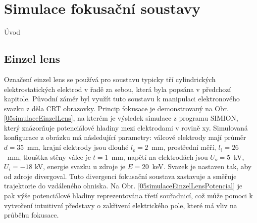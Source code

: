 \newpage
\chapter{Simulace fokusační soustavy}

Úvod

\section{Einzel lens}

Označení einzel lens se používá pro soustavu typicky tří cylindrických elektrostatických elektrod v řadě za sebou, která byla popsána v předchozí kapitole. Původní záměr byl využít tuto soustavu k manipulaci elektronového svazku z děla CRT obrazovky.
Princip fokusace je demonstrovaný na Obr. \ref{05simulaceEinzelLens}, na kterém je výsledek simulace z programu SIMION, který znázorňuje potenciálové hladiny mezi elektrodami v rovině xy. Simulovaná konfigurace z obrázku má následující parametry: válcové elektrody mají průměr $d=35$~mm, krajní elektrody jsou dlouhé $l_o = 2$~mm, prostřední měří, $l_i = 26$~mm, tloušťka stěny válce je $t=1$~mm, napětí na elektrodách jsou $U_o = 5$~kV, $U_i = -18$ kV, energie svazku u zdroje je $E = 20$~keV. Svazek je nastaven tak, aby od zdroje divergoval. Tuto divergenci fokusační soustava zastavuje a směřuje trajektorie do vzdáleného ohniska. Na Obr. \ref{05simulaceEinzelLensPotencial} je pak výše potenciálové hladiny reprezentována třetí souřadnicí, což může pomoci k vytvoření intuitivní představy o zakřivení elektrického pole, které má vliv na průběhu fokusace.\\

